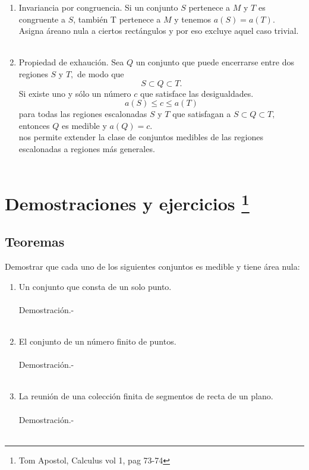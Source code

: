 \begin{tcolorbox}
\begin{enumerate}[\bfseries 5.]
\item Invariancia por congruencia. Si un conjunto $S$ pertenece a $M$ y $T$ es congruente a $S$, también T pertenece a $M$ y tenemos $a(S) = a(T).$\\
Asigna áreano nula a ciertos rectángulos y por eso excluye aquel caso trivial. \\\\

\item Propiedad de exhaución. Sea $Q$ un conjunto que puede encerrarse entre dos regiones $S$ y $T,$ de modo que $$ S \subset Q \subset T.$$  
Si existe uno y sólo un número $c$ que satisface las desigualdades. $$a(S) \leq c \leq a(T)$$
para todas las regiones escalonadas $S$ y $T$ que satisfagan a $S \subset Q \subset T,$ entonces $Q$ es medible y $a(Q)=c.$\\
nos permite extender la clase de conjuntos medibles de las regiones escalonadas a regiones más generales.\\\\
\end{enumerate}
\end{tcolorbox}

\section[Ejercicios y demostraciones]{Demostraciones y ejercicios \footnote{Tom Apostol, Calculus vol 1, pag 73-74}}
\subsection{Teoremas}

\begin{teo}
Demostrar que cada uno de los siguientes conjuntos es medible y tiene área nula:
\begin{enumerate}[\bfseries a)]
\item Un conjunto que consta de un solo punto.\\\\
Demostración.- \;   \\\\

\item El conjunto de un número finito de puntos.\\\\
Demostración.- \;   \\\\

\item La reunión de una colección finita de segmentos de recta de un plano. \\\\
Demostración.- \;   \\\\
\end{enumerate}
\end{teo}
